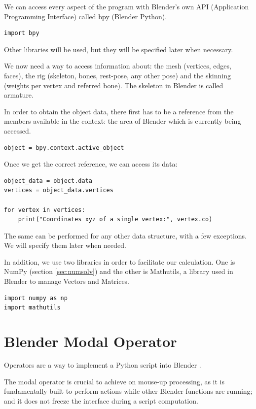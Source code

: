\documentclass[12pt,twoside]{report}
\begin{document}
We can access every aspect of the program with Blender's own API (Application Programming Interface) called bpy (Blender Python).

\begin{lstlisting}
import bpy
\end{lstlisting}

Other libraries will be used, but they will be specified later when necessary.

We now need a way to access information about: the mesh (vertices, edges, faces), the rig (skeleton, bones, rest-pose, any other pose) and the skinning (weights per vertex and referred bone). The skeleton in Blender is called armature.

In order to obtain the object data, there first has to be a reference from the members available in the context: the area of Blender which is currently being accessed.

\begin{lstlisting}
object = bpy.context.active_object
\end{lstlisting}

Once we get the correct reference, we can access its data:

\begin{lstlisting}
object_data = object.data
vertices = object_data.vertices

for vertex in vertices:
    print("Coordinates xyz of a single vertex:", vertex.co)
\end{lstlisting}

The same can be performed for any other data structure, with a few exceptions. We will specify them later when needed.

In addition, we use two libraries in order to facilitate our calculation. One is NumPy (section \ref{sec:numsolv}) and the other is Mathutils, a library used in Blender \cite{BlenderAPI} to manage Vectors and Matrices.

\begin{lstlisting}
import numpy as np
import mathutils
\end{lstlisting}

\section{Blender Modal Operator}

Operators are a way to implement a Python script into Blender \cite{BlenderAPI}.

The modal operator is crucial to achieve on mouse-up processing, as it is fundamentally built to perform actions while other Blender functions are running; and it does not freeze the interface during a script computation.
\end{document}

